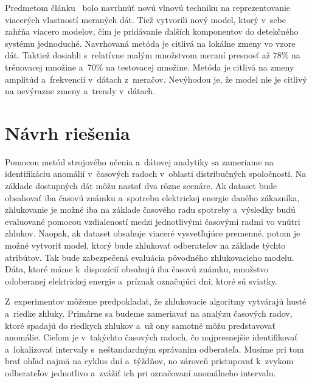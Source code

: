 \documentclass[a4paper,twoside,slovak,12pt,appendix]{article}
\begin{document}
Predmetom článku~\cite{Tagaris2002} bolo navrhnúť novú vlnovú techniku na
reprezentovanie viacerých vlastností meraných dát. Tiež vytvorili nový model,
ktorý v~sebe zahŕňa viacero modelov, čím je pridávanie ďalších komponentov do
detekčného systému jednoduché. Navrhovaná metóda je citlivá na lokálne zmeny vo
vzore dát. Taktiež dosiahli s~relatívne malým množstvom meraní presnosť až 78\%
na trénovacej množine a~70\% na testovacej množine. Metóda je citlivá na zmeny
amplitúd a~frekvencií v~dátach z~meračov. Nevýhodou je, že model nie je citlivý
na nevýrazne zmeny a~trendy v~dátach.\\



\newpage
\section{Návrh riešenia}
Pomocou metód strojového učenia a~dátovej analytiky sa zameriame na
identifikáciu anomálií v~časových radoch v~oblasti distribučných spoločností. Na
základe dostupných dát môžu nastať dva rôzne scenáre. Ak dataset bude obsahovať
iba časovú známku a~spotrebu elektrickej energie daného zákazníka, zhlukovanie
je možné iba na základe časového radu spotreby a~výsledky budú evaluované
pomocou vzdialeností medzi jednotlivými časovými radmi vo vnútri zhlukov.
Naopak, ak dataset obsahuje viaceré vysvetľujúce premenné, potom je možné
vytvoriť model, ktorý bude zhlukovať odberateľov na základe týchto atribútov.
Tak bude zabezpečená evaluácia pôvodného zhlukovacieho modelu. Dáta, ktoré máme
k~dispozícií obsahujú iba časovú známku, množstvo odoberanej elektrickej energie
a~príznak označujúci dni, ktoré sú sviatky.

Z~experimentov môžeme predpokladať, že zhlukovacie algoritmy vytvárajú husté
a~riedke zhluky. Primárne sa budeme zameriavať na analýzu časových radov,
ktoré spadajú do riedkych zhlukov a~už ony samotné môžu predstavovať anomálie.
Cieľom je v~takýchto časových radoch, čo najpresnejšie identifikovať
a~lokalizovať intervaly s~neštandardným správaním odberateľa. Musíme pri tom
brať ohľad najmä na cyklus dní a~týždňov, no zároveň pristupovať k~zvykom
odberateľov jednotlivo a~zvážiť ich pri označovaní anomálneho intervalu.
\end{document}
